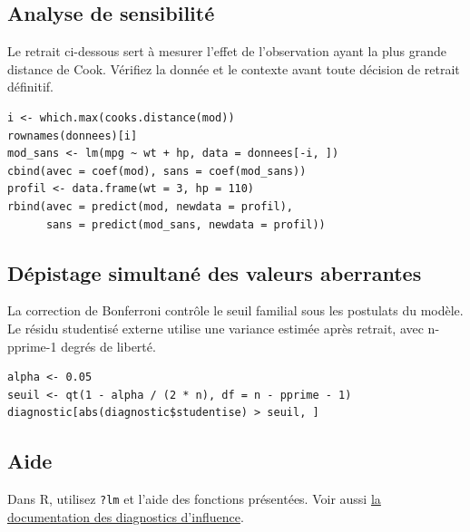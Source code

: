 \documentclass[letterpaper,11pt]{article}
\begin{document}
\par\medskip\noindent\begin{minipage}{\linewidth}
\subsection*{Analyse de sensibilité}
Le retrait ci-dessous sert à mesurer l'effet de l'observation ayant la plus grande distance de Cook. Vérifiez la donnée et le contexte avant toute décision de retrait définitif.
\begin{Verbatim}
i <- which.max(cooks.distance(mod))
rownames(donnees)[i]
mod_sans <- lm(mpg ~ wt + hp, data = donnees[-i, ])
cbind(avec = coef(mod), sans = coef(mod_sans))
profil <- data.frame(wt = 3, hp = 110)
rbind(avec = predict(mod, newdata = profil),
      sans = predict(mod_sans, newdata = profil))
\end{Verbatim}

\end{minipage}\par
\par\medskip\noindent\begin{minipage}{\linewidth}
\subsection*{Dépistage simultané des valeurs aberrantes}
La correction de Bonferroni contrôle le seuil familial sous les postulats du modèle. Le résidu studentisé externe utilise une variance estimée après retrait, avec n-pprime-1 degrés de liberté.
\begin{Verbatim}
alpha <- 0.05
seuil <- qt(1 - alpha / (2 * n), df = n - pprime - 1)
diagnostic[abs(diagnostic$studentise) > seuil, ]
\end{Verbatim}

\end{minipage}\par
\par\medskip\noindent\begin{minipage}{\linewidth}
\subsection*{Aide}
Dans R, utilisez \texttt{?lm} et l’aide des fonctions présentées. Voir aussi \href{https://stat.ethz.ch/R-manual/R-devel/library/stats/html/influence.measures.html}{la documentation des diagnostics d’influence}.
\end{minipage}\par
\end{document}
